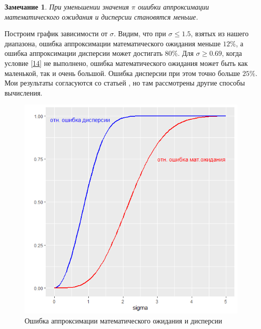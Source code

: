 \documentclass[specialist, substylefile = spbu.rtx,
subf,href,colorlinks=true, 12pt]{disser}
\newtheorem{zam}{Замечание}
\begin{document}
	\begin{zam}
		При уменьшении значения $\pi$ ошибки аппроксимации математического ожидания и дисперсии становятся меньше.
	\end{zam}
	
	Построим график зависимости от $\sigma$. Видим, что при $\sigma\leq1.5$, взятых из нашего диапазона, ошибка аппроксимации математического ожидания меньше $12\%$, а ошибка аппроксимации дисперсии может достигать $80\%$. Для $\sigma\geq 0.69$, когда условие \eqref{14} не выполнено, ошибка математического ожидания может быть как маленькой, так и очень большой. Ошибка дисперсии при этом точно больше $25\%$. Мои результаты согласуются со статьей \cite{Simulation}, но там рассмотрены другие способы вычисления.
	
	\begin{figure}[!hhh]
		\begin{center}
			\begin{minipage}[h]{0.8\linewidth}
				\includegraphics[width=1\linewidth]{img/par_new2.jpg}
				\caption{Ошибка аппроксимации математического ожидания и дисперсии} %
				\label{ris:image1} %
			\end{minipage}
			
		\end{center}
	\end{figure}
	
\end{document}
